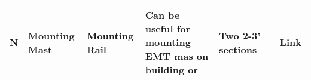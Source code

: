 \documentclass[
]{article}
\begin{document}
\begin{longtable}[]{@{}lllllll@{}}
\begin{minipage}[t]{0.12\columnwidth}
N\strut
\end{minipage} & \begin{minipage}[t]{0.12\columnwidth}\raggedright
Mounting Mast\strut
\end{minipage} & \begin{minipage}[t]{0.12\columnwidth}\raggedright
Mounting Rail\strut
\end{minipage} & \begin{minipage}[t]{0.12\columnwidth}\raggedright
Can be useful for mounting EMT mas on building or\strut
\end{minipage} & \begin{minipage}[t]{0.12\columnwidth}\raggedright
Two 2-3' sections\strut
\end{minipage} & \begin{minipage}[t]{0.12\columnwidth}\raggedright
\strut
\end{minipage} & \begin{minipage}[t]{0.12\columnwidth}\raggedright
\href{https://www.lowes.com/search?searchTerm=superstrut+gold-galvanized+half+slot+channel+strut}{Link}\strut
\end{minipage}\tabularnewline
\bottomrule
\end{longtable}
\end{document}
